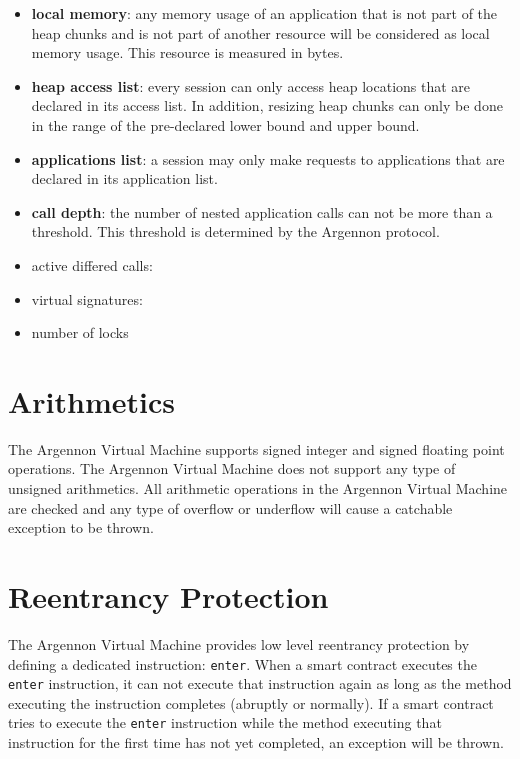 \begin{itemize}
    \item \textbf{local memory}:
    any memory usage of an application that is not part of the heap chunks and is not part of another resource
    will be considered as local memory usage. This resource is measured in bytes.
    \item \textbf{heap access list}:
    every session can only access heap locations that are declared in its access list. In addition,
    resizing heap chunks can only be done in the range of the pre-declared lower bound and upper bound.
    \item \textbf{applications list}:
    a session may only make requests to applications that are declared in its application list.
    \item \textbf{call depth}:
    the number of nested application calls can not be more than a threshold. This threshold is determined by the
    Argennon protocol.
    \item active differed calls:
    \item virtual signatures:
    \item number of locks

\end{itemize}


\section{Arithmetics}\label{sec:arithmetics}

The Argennon Virtual Machine supports signed integer and signed floating point operations. The Argennon Virtual
Machine does not support any type of unsigned arithmetics. All arithmetic operations in the Argennon Virtual Machine
are checked and any type of overflow or underflow will cause a catchable exception to be thrown.


\section{Reentrancy Protection}\label{sec:reentrancy}

The Argennon Virtual Machine provides low level reentrancy protection by defining a dedicated
instruction: \texttt{enter}. When a smart contract executes the \texttt{enter} instruction, it
can not execute that instruction again as long
as the method executing the instruction completes (abruptly or normally). If a smart contract tries to execute
the \texttt{enter} instruction while the method executing that instruction for the first time has not yet completed,
an exception will be thrown.

